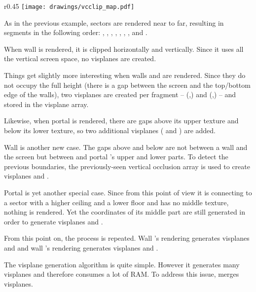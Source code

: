 \begin{wrapfigure}[16]{r}{0.45\textwidth}
\centering
\texttt{[image: drawings/vcclip\_map.pdf]}
\end{wrapfigure}
As in the previous example, sectors are rendered near to far, resulting in segments in the following order: , , , , , , , and .\\
\par
When wall  is rendered, it is clipped horizontally and vertically. Since it uses all the vertical screen space, no visplanes are created.\\
\par
 Things get slightly more interesting when walls  and  are rendered. Since they do not occupy the full height (there is a gap between the screen and the top/bottom edge of the walls), two visplanes are created per fragment -- (,) and (,) -- and stored in the visplane array.\\
 \par
  Likewise, when portal  is rendered, there are gaps above its upper texture and below its lower texture, so two additional visplanes ( and ) are added.\\
\par
Wall  is another new case. The gaps above and below are not between a wall and the screen but between   and portal 's upper and lower parts. To detect the previous boundaries, the previously-seen vertical occlusion array is used to create visplanes  and .\\
\par
Portal  is yet another special case. Since from this point of view it is connecting to a sector with a higher ceiling and a lower floor and has no middle texture, nothing is rendered. Yet the coordinates of its middle part are still generated in order to generate visplanes  and  .\\
\par
From this point on, the process is repeated. Wall 's rendering generates visplanes  and   and wall 's rendering generates visplanes  and  .\\
\par
The visplane generation algorithm is quite simple. However it generates many visplanes and therefore consumes a lot of RAM. To address this issue, \doom{} merges visplanes.\\
\par
{}








